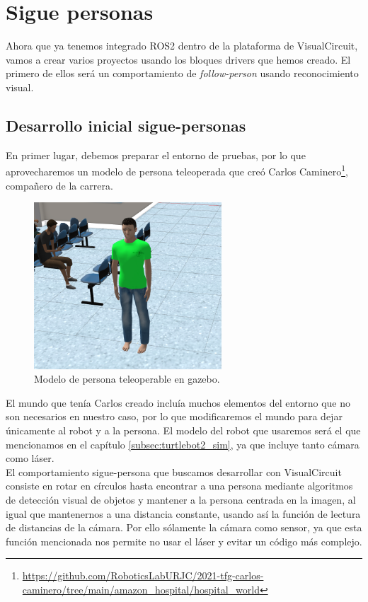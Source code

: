 \chapter{Sigue personas}
\label{cap:capitulo5}
Ahora que ya tenemos integrado ROS2 dentro de la plataforma de VisualCircuit, vamos a crear varios proyectos usando los bloques drivers que hemos creado.
El primero de ellos será un comportamiento de \textit{follow-person} usando reconocimiento visual.

\section{Desarrollo inicial sigue-personas}
\label{sec:VC_intro}

En primer lugar, debemos preparar el entorno de pruebas, por lo que aprovecharemos un modelo de persona teleoperada que creó Carlos
Caminero\footnote{\url{https://github.com/RoboticsLabURJC/2021-tfg-carlos-caminero/tree/main/amazon_hospital/hospital_world}}, compañero de la carrera.

\begin{figure} [H]
    \begin{center}
        \includegraphics[width=7cm]{figs/c5/elman.png}
    \end{center}
    \caption[Modelo de persona en gazebo]{Modelo de persona teleoperable en gazebo.}
    \label{fig:teleop_person}
\end{figure}
El mundo que tenía Carlos creado incluía muchos elementos del entorno que no son necesarios en nuestro caso, por lo que modificaremos el
mundo para dejar únicamente al robot y a la persona. El modelo del robot que usaremos será el que mencionamos en el capítulo \ref{subsec:turtlebot2_sim},
ya que incluye tanto cámara como láser.\\

El comportamiento sigue-persona que buscamos desarrollar con VisualCircuit consiste en rotar en círculos hasta encontrar a una persona mediante
algoritmos de detección visual de objetos y mantener a la persona centrada en la imagen, al igual que mantenernos a una distancia constante,
usando así la función de lectura de distancias de la cámara. Por ello sólamente la cámara como sensor, ya que esta función mencionada nos permite no
usar el láser y evitar un código más complejo.\\

